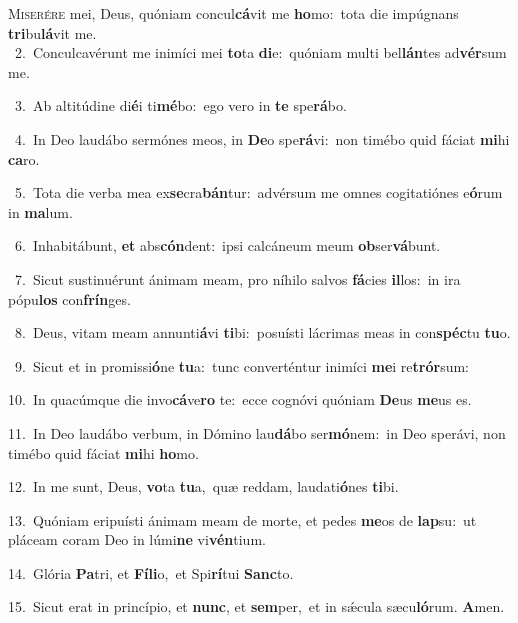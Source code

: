 \lettrine{\initial\textcolor{\initialcolor}{M}}{iserére} mei, Deus, quóniam concul\-\textbf{cá}\-vit me \textbf{ho}\-mo:~\star tota die impúgnans \textbf{tri}\-bu\-\textbf{lá}\-vit me.\\
{\numbfont\textcolor{\numbcolor}{~2.}}~Conculcavérunt me inimíci mei \textbf{to}\-ta \textbf{di}\-e:~\star quóniam multi bel\-\textbf{lán}\-tes ad\-\textbf{vér}\-sum me.\par
{\numbfont\textcolor{\numbcolor}{~3.}}~Ab altitúdine di\-\textbf{é}\-i ti\-\textbf{mé}\-bo:~\star ego vero in \textbf{te} spe\-\textbf{rá}\-bo.\par
{\numbfont\textcolor{\numbcolor}{~4.}}~In Deo laudábo sermónes meos, in \textbf{De}\-o spe\-\textbf{rá}\-vi:~\star non timébo quid fáciat \textbf{mi}\-hi \textbf{ca}\-ro.\par
{\numbfont\textcolor{\numbcolor}{~5.}}~Tota die verba mea ex\-\textbf{se}\-cra\-\textbf{bán}\-tur:~\star advérsum me omnes cogitatiónes e\-\textbf{ó}\-rum in \textbf{ma}\-lum.\par
{\numbfont\textcolor{\numbcolor}{~6.}}~Inhabitábunt, \textbf{et} abs\-\textbf{cón}\-dent:~\star ipsi calcáneum meum \textbf{ob}\-ser\-\textbf{vá}\-bunt.\par
{\numbfont\textcolor{\numbcolor}{~7.}}~Sicut sustinuérunt ánimam meam, pro níhilo salvos \textbf{fá}\-cies \textbf{il}\-los:~\star in ira pópu\textbf{los} con\-\textbf{frín}\-ges.\par
{\numbfont\textcolor{\numbcolor}{~8.}}~Deus, vitam meam annunti\-\textbf{á}\-vi \textbf{ti}\-bi:~\star posuísti lácrimas meas in con\-\textbf{spéc}\-tu \textbf{tu}\-o.\par
{\numbfont\textcolor{\numbcolor}{~9.}}~Sicut et in promissi\-\textbf{ó}\-ne \textbf{tu}\-a:~\star tunc converténtur inimíci \textbf{me}\-i re\-\textbf{trór}\-sum:\par
{\numbfont\textcolor{\numbcolor}{10.}}~In quacúmque die invo\-\textbf{cá}\-ve\textbf{ro} te:~\star ecce cognóvi quóniam \textbf{De}\-us \textbf{me}\-us es.\par
{\numbfont\textcolor{\numbcolor}{11.}}~In Deo laudábo verbum, in Dómino lau\-\textbf{dá}\-bo ser\-\textbf{mó}\-nem:~\star in Deo sperávi, non timébo quid fáciat \textbf{mi}\-hi \textbf{ho}\-mo.\par
{\numbfont\textcolor{\numbcolor}{12.}}~In me sunt, Deus, \textbf{vo}\-ta \textbf{tu}\-a,~\star quæ reddam, laudati\-\textbf{ó}\-nes \textbf{ti}\-bi.\par
{\numbfont\textcolor{\numbcolor}{13.}}~Quóniam eripuísti ánimam meam de morte, et pedes \textbf{me}\-os de \textbf{lap}\-su:~\star ut pláceam coram Deo in lúmi\textbf{ne} vi\-\textbf{vén}\-tium.\par
{\numbfont\textcolor{\numbcolor}{14.}}~Glória \textbf{Pa}\-tri, et \textbf{Fí}\-\textbf{li}o,~\star et Spi\-\textbf{rí}\-tui \textbf{Sanc}\-to.\par
{\numbfont\textcolor{\numbcolor}{15.}}~Sicut erat in princípio, et \textbf{nunc}\-, et \textbf{sem}\-per,~\star et in sǽcula sæcu\-\textbf{ló}\-rum. \textbf{A}\-men.\par
